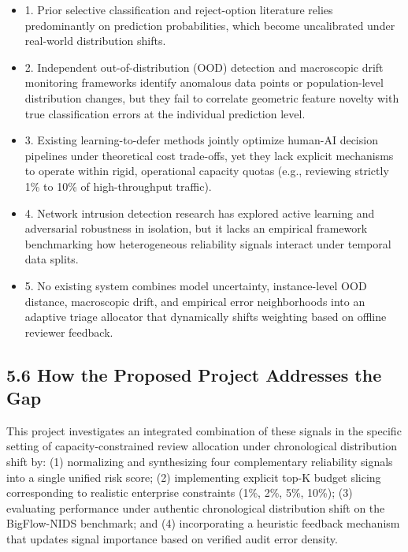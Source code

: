 \begin{itemize}
\item 1. Prior selective classification and reject-option literature relies predominantly on prediction probabilities, which become uncalibrated under real-world distribution shifts.
\item 2. Independent out-of-distribution (OOD) detection and macroscopic drift monitoring frameworks identify anomalous data points or population-level distribution changes, but they fail to correlate geometric feature novelty with true classification errors at the individual prediction level.
\item 3. Existing learning-to-defer methods jointly optimize human-AI decision pipelines under theoretical cost trade-offs, yet they lack explicit mechanisms to operate within rigid, operational capacity quotas (e.g., reviewing strictly 1\% to 10\% of high-throughput traffic).
\item 4. Network intrusion detection research has explored active learning and adversarial robustness in isolation, but it lacks an empirical framework benchmarking how heterogeneous reliability signals interact under temporal data splits.
\item 5. No existing system combines model uncertainty, instance-level OOD distance, macroscopic drift, and empirical error neighborhoods into an adaptive triage allocator that dynamically shifts weighting based on offline reviewer feedback.
\end{itemize}

\subsection{5.6 How the Proposed Project Addresses the Gap}

This project investigates an integrated combination of these signals in the specific setting of capacity-constrained review allocation under chronological distribution shift by: (1) normalizing and synthesizing four complementary reliability signals into a single unified risk score; (2) implementing explicit top-K budget slicing corresponding to realistic enterprise constraints (1\%, 2\%, 5\%, 10\%); (3) evaluating performance under authentic chronological distribution shift on the BigFlow-NIDS benchmark; and (4) incorporating a heuristic feedback mechanism that updates signal importance based on verified audit error density.

